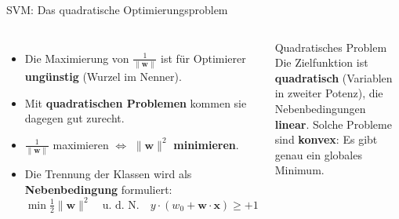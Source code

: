 \begin{frame}{SVM: Das quadratische Optimierungsproblem}
\begin{columns}

\begin{itemize}
  \item Die Maximierung von $\frac{1}{\lVert\mathbf{w}\rVert}$ ist für
        Optimierer \textbf{ungünstig} (Wurzel im Nenner).
  \item Mit \textbf{quadratischen Problemen} kommen sie dagegen gut zurecht.
  \item $\frac{1}{\lVert\mathbf{w}\rVert}$ maximieren $\Leftrightarrow$
        $\lVert\mathbf{w}\rVert^2$ \textbf{minimieren}.
  \item Die Trennung der Klassen wird als \textbf{Nebenbedingung}
        formuliert:
        \[
          \min \tfrac{1}{2}\lVert\mathbf{w}\rVert^2 \quad\text{u.~d.~N.}\quad
          y \cdot (w_0 + \mathbf{w}\cdot\mathbf{x}) \geq +1
        \]
\end{itemize}

\begin{blockC1}{Quadratisches Problem}
Die Zielfunktion ist \textbf{quadratisch} (Variablen in zweiter Potenz),
die Nebenbedingungen \textbf{linear}. Solche Probleme sind \textbf{konvex}:
Es gibt genau ein globales Minimum.
\end{blockC1}
\end{columns}


\end{frame}

